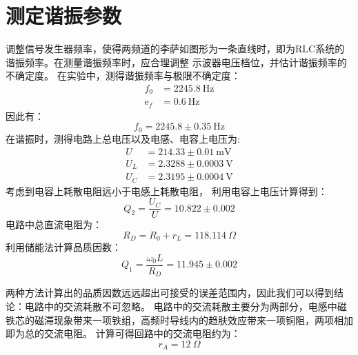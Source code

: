 \documentclass{ctexart}
\newcommand\ohm{\ \Omega}
\begin{document}
    \section{测定谐振参数}
    调整信号发生器频率，使得两频道的李萨如图形为一条直线时，即为RLC系统的谐振频率。在测量谐振频率时，应合理调整
    示波器电压档位，并估计谐振频率的不确定度。
    在实验中，测得谐振频率与极限不确定度：
    \begin{align}
        f_0 &= 2245.8 \ \mathrm{Hz} \\
        \mathrm{e}_f &= 0.6 \ \mathrm{Hz}
    \end{align}
    因此有：
    \begin{equation}
        f_0 = 2245.8 \pm 0.35 \ \mathrm{Hz} 
    \end{equation}
    在谐振时，测得电路上总电压以及电感、电容上电压为:
    \begin{align}
        U &= 214.33 \pm 0.01 \ \mathrm{mV} \\
        U_L &= 2.3288 \pm 0.0003 \ \mathrm{V} \\
        U_C &= 2.3195 \pm 0.0004 \ \mathrm{V}
    \end{align}
    考虑到电容上耗散电阻远小于电感上耗散电阻， 利用电容上电压计算得到：
    \begin{equation}
        Q_2 = \frac{U_C}{U} = 10.822 \pm 0.002
    \end{equation}
    电路中总直流电阻为：
    \begin{equation}
        R_D = R_0 + r_L = 118.114 \ohm
    \end{equation}
    利用储能法计算品质因数：
    \begin{equation}
        Q_1 = \frac{\omega_0 L}{R_D} = 11.945 \pm 0.002
    \end{equation}

    两种方法计算出的品质因数远远超出可接受的误差范围内，因此我们可以得到结论：电路中的交流耗散不可忽略。
    电路中的交流耗散主要分为两部分，电感中磁铁芯的磁滞现象带来一项铁组，高频时导线内的趋肤效应带来一项铜阻，两项相加即为总的交流电阻。
    计算可得回路中的交流电阻约为：
    \begin{equation}
        r_A = 12 \ohm
    \end{equation}
\end{document}
